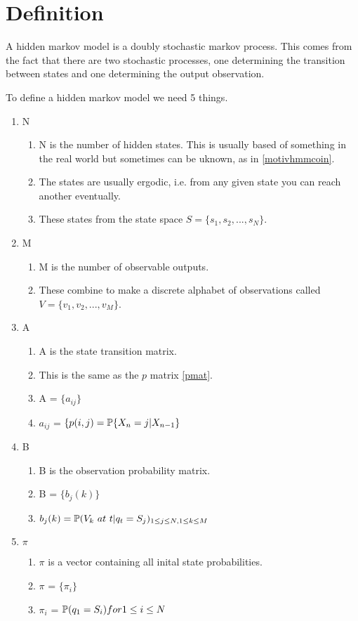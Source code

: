 \section{Definition}

A hidden markov model is a doubly stochastic markov process. This comes from the fact that there are two stochastic processes, one determining the transition between states and one determining the output observation. 

To define a hidden markov model we need 5 things.
\begin{enumerate}
    \item N \begin{enumerate}[i]
        \item N is the number of hidden states. This is usually based of something in the real world but sometimes can be uknown, as in \ref{motivhmmcoin}.
        \item The states are usually ergodic, i.e. from any given state you can reach another eventually.
        \item These states from the state space $S = \{s_1,s_2,...,s_N\}$.
        \end{enumerate}
    \item M \begin{enumerate}[i]
        \item M is the number of observable outputs.
        \item These combine to make a discrete alphabet of observations called $V = \{v_1, v_2,...,v_M\}$.
    \end{enumerate}
    \item A \begin{enumerate}[i]
        \item A is the state transition matrix.
        \item This is the same as the $p$ matrix \ref{pmat}. 
        \item A = $\{a_{ij}\}$ 
        \item $a_{ij}$ = $\{ p(i,j) = \mathbb{P} \{ X_n = j | X_{n-1}\}$
    \end{enumerate}
    \item B \begin{enumerate}[i]
        \item B is the observation probability matrix.
        \item B = $\{b_j(k)\}$
        \item $b_j(k) = \mathbb{P} (V_k \  at \  t | q_t = S_j)_{1 \leq j \leq N, 1 \leq k \leq M}$
    \end{enumerate}
    \item $\pi$ \begin{enumerate}[i]
        \item $\pi$ is a vector containing all inital state probabilities. 
        \item $\pi$ = $\{ \pi_i \}$
        \item $\pi_i$ = $\mathbb{P} (q_1 = S_i) for 1 \leq i \leq N$
    \end{enumerate}
\end{enumerate}

